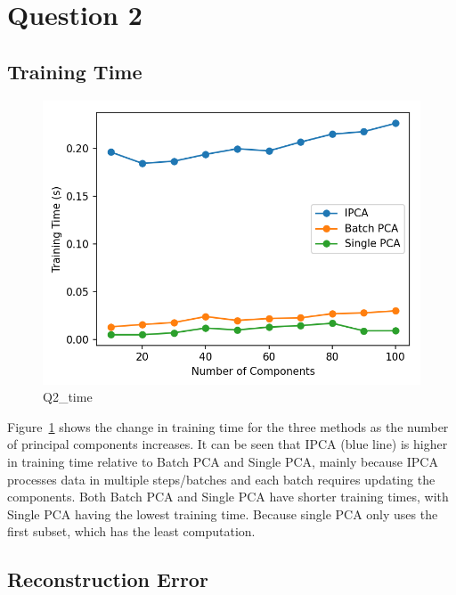 \section{Question 2} 
\label{sec:Q2}

\subsection{Training Time}

\begin{figure}[h]
	\centering
	\includegraphics[width=0.8\linewidth]{Ressources/Q2_time.png}
	
	\caption{Q2\_time}
	\label{fig:Q2_time}
\end{figure}

Figure~\ref{fig:Q2_time} shows the change in training time for the three methods as the number of principal components increases. It can be seen that IPCA (blue line) is higher in training time relative to Batch PCA and Single PCA, mainly because IPCA processes data in multiple steps/batches and each batch requires updating the components. Both Batch PCA and Single PCA have shorter training times, with Single PCA having the lowest training time. Because single PCA only uses the first subset, which has the least computation.

\subsection{Reconstruction Error}

